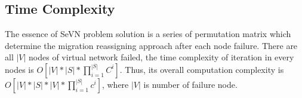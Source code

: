 
\subsection{Time Complexity}
The essence of SeVN problem solution is a series of permutation matrix  which determine the migration reassigning approach after each node failure. There are all $|V|$ nodes of virtual network failed, the time complexity of iteration in every nodes is $O[|V|*|S|*\prod_{i=1}^{|S|}C^i]$. Thus, its overall computation complexity is $O[|V|*|S|*|V|*\prod_{i=1}^{|S|}c^i]$, where $|V|$ is number of failure node.
